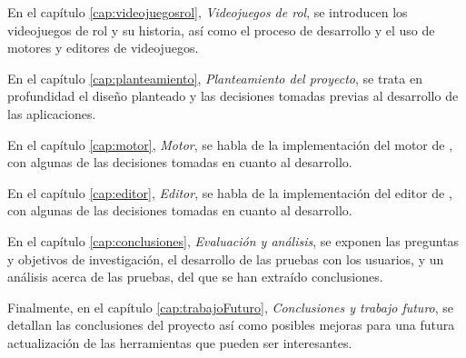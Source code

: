 \medskip

En el capítulo \ref{cap:videojuegosrol}, \textit{Videojuegos de rol}, se introducen los videojuegos de rol y su historia, así como el proceso de desarrollo y el uso de motores y editores de videojuegos.

\medskip

En el capítulo \ref{cap:planteamiento}, \textit{Planteamiento del proyecto}, se trata en profundidad el diseño planteado y las decisiones tomadas previas al desarrollo de las aplicaciones.

\medskip

En el capítulo \ref{cap:motor}, \textit{Motor}, se habla de la implementación del motor de \baker, con algunas de las decisiones tomadas en cuanto al desarrollo.

\medskip

En el capítulo \ref{cap:editor}, \textit{Editor}, se habla de la implementación del editor de \baker, con algunas de las decisiones tomadas en cuanto al desarrollo.

\medskip

En el capítulo \ref{cap:conclusiones}, \textit{Evaluación y análisis}, se exponen las preguntas y objetivos de investigación, el desarrollo de las pruebas con los usuarios, y un análisis acerca de las pruebas, del que se han extraído conclusiones.

\medskip

Finalmente, en el capítulo \ref{cap:trabajoFuturo}, \textit{Conclusiones y trabajo futuro}, se detallan las conclusiones del proyecto así como posibles mejoras para una futura actualización de las herramientas que pueden ser interesantes.